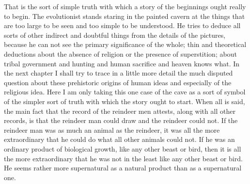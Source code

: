 That is the sort of simple truth with which a story of the beginnings ought really to begin. The evolutionist stands staring in the painted cavern at the things that are too large to be seen and too simple to be understood. He tries to deduce all sorts of other indirect and doubtful things from the details of the pictures, because he can not see the primary significance of the whole; thin and theoretical deductions about the absence of religion or the presence of superstition; about tribal government and hunting and human sacrifice and heaven knows what. In the next chapter I shall try to trace in a little more detail the much disputed question about these prehistoric origins of human ideas and especially of the religious idea. Here I am only taking this one case of the cave as a sort of symbol of the simpler sort of truth with which the story ought to start. When all is said, the main fact that the record of the reindeer men attests, along with all other records, is that the reindeer man could draw and the reindeer could not. If the reindeer man was as much an animal as the reindeer, it was all the more extraordinary that he could do what all other animals could not. If he was an ordinary product of biological growth, like any other beast or bird, then it is all the more extraordinary that he was not in the least like any other beast or bird. He seems rather more supernatural as a natural product than as a supernatural one.

